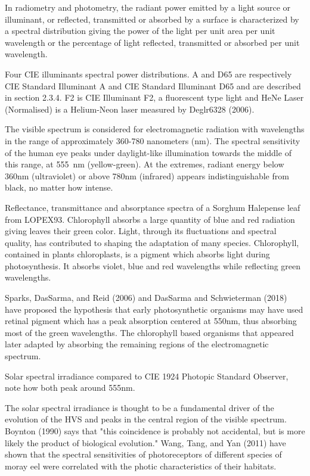 In radiometry and photometry, the radiant power emitted by a light source or illuminant, or reflected, transmitted or absorbed by a surface is characterized by a spectral distribution giving the power of the light per unit area per unit wavelength or the percentage of light reflected, transmitted or absorbed per unit wavelength.


Four CIE illuminants spectral power distributions. A and D65 are respectively CIE Standard Illuminant A and CIE Standard Illuminant D65 and are described in section 2.3.4. F2 is CIE Illuminant F2, a fluorescent type light and HeNe Laser (Normalised) is a Helium-Neon laser measured by Deglr6328 (2006).

The visible spectrum is considered for electromagnetic radiation with wavelengths in the range of approximately 360-780 nanometers (nm). The spectral sensitivity of the human eye peaks under daylight-like illumination towards the middle of this range, at \SI{555}{\nm} (yellow-green). At the extremes, radiant energy below 360nm (ultraviolet)  or above 780nm (infrared) appears indistinguishable from black, no matter how intense.


Reflectance, transmittance and absorptance spectra of a Sorghum Halepense leaf from LOPEX93. Chlorophyll absorbs a large quantity of blue and red radiation giving leaves their green color.
Light, through its fluctuations and spectral quality, has contributed to shaping the adaptation of many species. Chlorophyll, contained in plants chloroplasts, is a pigment which absorbs light during photosynthesis. It absorbs violet, blue and red wavelengths while reflecting green wavelengths.

Sparks, DasSarma, and Reid (2006) and DasSarma and Schwieterman (2018) have proposed the hypothesis that early photosynthetic organisms may have used retinal pigment which has a peak absorption centered at 550nm, thus absorbing most of the green wavelengths. The chlorophyll based organisms that appeared later adapted by absorbing the remaining regions of the electromagnetic spectrum.



Solar spectral irradiance compared to CIE 1924 Photopic Standard Observer, note how both peak around 555nm.

The solar spectral irradiance is thought to be a fundamental driver of the evolution of the HVS and peaks in the central region of the visible spectrum. Boynton (1990) says that "this coincidence is probably not accidental, but is more likely the product of biological evolution." Wang, Tang, and Yan (2011) have shown that the spectral sensitivities of photoreceptors of different species of moray eel were correlated with the photic characteristics of their habitats.

